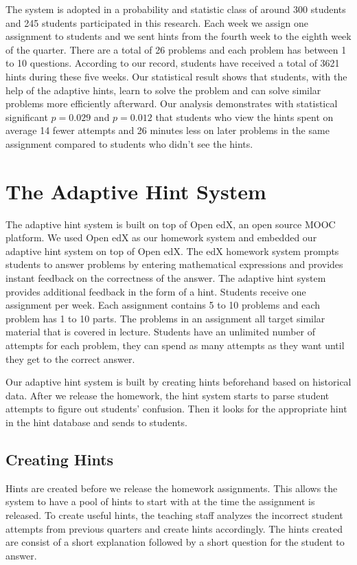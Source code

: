\documentclass{llncs}
\begin{document}
The system is adopted in a probability and statistic class of around 300 students and 245 students participated in this research. Each week we assign one assignment to students and we sent hints from the fourth week to the eighth week of the quarter. There are a total of 26 problems and each problem has between 1 to 10 questions. According to our record, students have received a total of 3621 hints during these five weeks. Our statistical result shows that students, with the help of the adaptive hints, learn to solve the problem and can solve similar problems more efficiently afterward. Our analysis demonstrates with statistical significant $p=0.029$ and $p=0.012$ that students who view the hints spent on average 14 fewer attempts and 26 minutes less on later problems in the same assignment compared to students who didn't see the hints.


\section{The Adaptive Hint System}
The adaptive hint system is built on top of Open edX, an open source MOOC platform. We used Open edX as our homework system and embedded our adaptive hint system on top of Open edX. The edX homework system prompts students to answer problems by entering mathematical expressions and provides instant feedback on the correctness of the answer. The adaptive hint system provides additional feedback in the form of a hint. Students receive one assignment per week. Each assignment contains 5 to 10 problems and each problem has 1 to 10 parts. The problems in an assignment all target similar material that is covered in lecture. Students have an unlimited number of attempts for each problem, they can spend as many attempts as they want until they get to the correct answer.

Our adaptive hint system is built by creating hints beforehand based on historical data. After we release the homework, the hint system starts to parse student attempts to figure out students' confusion. Then it looks for the appropriate hint in the hint database and sends to students.


\subsection*{Creating Hints}

Hints are created before we release the homework assignments. This allows the system to have a pool of hints to start with at the time the assignment is released. To create useful hints, the teaching staff analyzes the incorrect student attempts from previous quarters and create hints accordingly. The hints created are consist of a short explanation followed by a short question for the student to answer.
\end{document}
